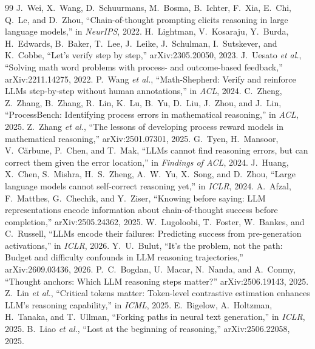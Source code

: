 \begin{thebibliography}{99}\small
{} J.~Wei, X.~Wang, D.~Schuurmans, M.~Bosma, B.~Ichter, F.~Xia, E.~Chi, Q.~Le, and D.~Zhou, ``Chain-of-thought prompting elicits reasoning in large language models,'' in \emph{NeurIPS}, 2022.
 H.~Lightman, V.~Kosaraju, Y.~Burda, H.~Edwards, B.~Baker, T.~Lee, J.~Leike, J.~Schulman, I.~Sutskever, and K.~Cobbe, ``Let's verify step by step,'' arXiv:2305.20050, 2023.
 J.~Uesato \emph{et al.}, ``Solving math word problems with process- and outcome-based feedback,'' arXiv:2211.14275, 2022.
 P.~Wang \emph{et al.}, ``Math-Shepherd: Verify and reinforce LLMs step-by-step without human annotations,'' in \emph{ACL}, 2024.
 C.~Zheng, Z.~Zhang, B.~Zhang, R.~Lin, K.~Lu, B.~Yu, D.~Liu, J.~Zhou, and J.~Lin, ``ProcessBench: Identifying process errors in mathematical reasoning,'' in \emph{ACL}, 2025.
 Z.~Zhang \emph{et al.}, ``The lessons of developing process reward models in mathematical reasoning,'' arXiv:2501.07301, 2025.
 G.~Tyen, H.~Mansoor, V.~C\u{a}rbune, P.~Chen, and T.~Mak, ``LLMs cannot find reasoning errors, but can correct them given the error location,'' in \emph{Findings of ACL}, 2024.
 J.~Huang, X.~Chen, S.~Mishra, H.~S.~Zheng, A.~W.~Yu, X.~Song, and D.~Zhou, ``Large language models cannot self-correct reasoning yet,'' in \emph{ICLR}, 2024.
 A.~Afzal, F.~Matthes, G.~Chechik, and Y.~Ziser, ``Knowing before saying: LLM representations encode information about chain-of-thought success before completion,'' arXiv:2505.24362, 2025.
 W.~Lugoloobi, T.~Foster, W.~Bankes, and C.~Russell, ``LLMs encode their failures: Predicting success from pre-generation activations,'' in \emph{ICLR}, 2026.
 Y.~U.~Bulut, ``It's the problem, not the path: Budget and difficulty confounds in LLM reasoning trajectories,'' arXiv:2609.03436, 2026.
 P.~C.~Bogdan, U.~Macar, N.~Nanda, and A.~Conmy, ``Thought anchors: Which LLM reasoning steps matter?'' arXiv:2506.19143, 2025.
 Z.~Lin \emph{et al.}, ``Critical tokens matter: Token-level contrastive estimation enhances LLM's reasoning capability,'' in \emph{ICML}, 2025.
 E.~Bigelow, A.~Holtzman, H.~Tanaka, and T.~Ullman, ``Forking paths in neural text generation,'' in \emph{ICLR}, 2025.
 B.~Liao \emph{et al.}, ``Lost at the beginning of reasoning,'' arXiv:2506.22058, 2025.

\end{thebibliography}
